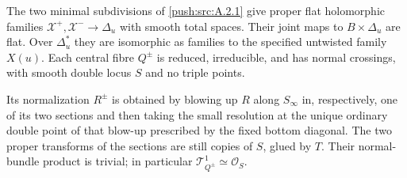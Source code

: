 \begin{theorem}\label{push:src:A.2.2}\label{push:A22}
The two minimal subdivisions of \ref{push:src:A.2.1} give proper flat holomorphic
families $\mathcal X^+,\mathcal X^-\to\Delta_u$ with smooth total
spaces. Their joint maps to $B\times\Delta_u$ are flat. Over
$\Delta_u^*$ they are isomorphic as families to the specified
untwisted family $X(u)$. Each central fibre $Q^\pm$ is reduced,
irreducible, and has normal crossings, with smooth double locus
$S$ and no triple points.

Its normalization $R^\pm$ is obtained by blowing up $R$ along
$S_\infty$ in, respectively, one of its two sections and then
taking the small resolution at the unique ordinary double point
of that blow-up prescribed by the fixed bottom diagonal.
The two proper transforms of the sections are still copies of
$S$, glued by $T$. Their normal-bundle product is trivial;
in particular $\mathcal T^1_{Q^\pm}\simeq\mathcal O_S$.
\end{theorem}

